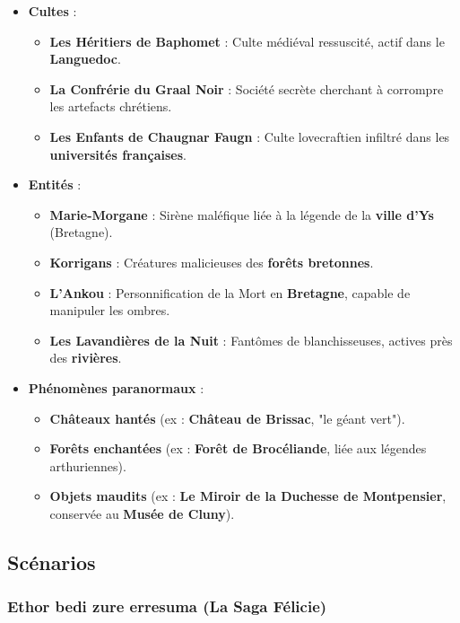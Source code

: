 \documentclass[10pt,a5paper,twoside]{book}
\begin{document}
\begin{itemize}
\item \textbf{Cultes} :
	\begin{itemize}
		\item \textbf{Les Héritiers de Baphomet} : Culte médiéval ressuscité, actif dans le \textbf{Languedoc}.
		\item \textbf{La Confrérie du Graal Noir} : Société secrète cherchant à corrompre les artefacts chrétiens.
		\item \textbf{Les Enfants de Chaugnar Faugn} : Culte lovecraftien infiltré dans les \textbf{universités françaises}.
	\end{itemize}
	\item \textbf{Entités} :
	\begin{itemize}
		\item \textbf{Marie-Morgane} : Sirène maléfique liée à la légende de la \textbf{ville d'Ys} (Bretagne).
		\item \textbf{Korrigans} : Créatures malicieuses des \textbf{forêts bretonnes}.
		\item \textbf{L'Ankou} : Personnification de la Mort en \textbf{Bretagne}, capable de manipuler les ombres.
		\item \textbf{Les Lavandières de la Nuit} : Fantômes de blanchisseuses, actives près des \textbf{rivières}.
	\end{itemize}
	\item \textbf{Phénomènes paranormaux} :
	\begin{itemize}
		\item \textbf{Châteaux hantés} (ex : \textbf{Château de Brissac}, "le géant vert").
		\item \textbf{Forêts enchantées} (ex : \textbf{Forêt de Brocéliande}, liée aux légendes arthuriennes).
		\item \textbf{Objets maudits} (ex : \textbf{Le Miroir de la Duchesse de Montpensier}, conservée au \textbf{Musée de Cluny}).
	\end{itemize}
\end{itemize}

\newpage

\subsection{Scénarios}

\subsubsection{Ethor bedi zure erresuma (La Saga Félicie)}
\end{document}
